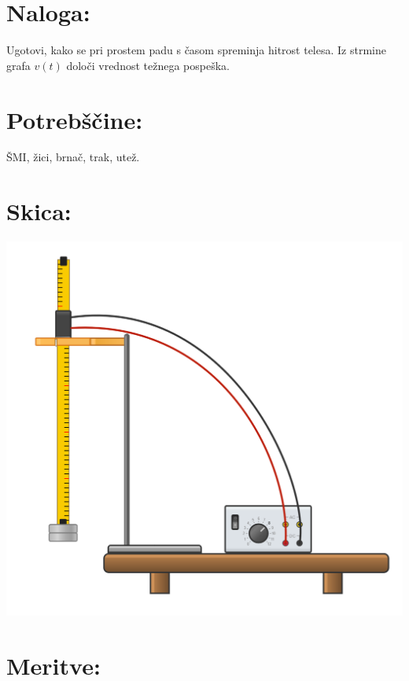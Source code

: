 \documentclass[a4paper]{article}
\begin{document}



\section*{Naloga:} %

Ugotovi, kako se pri prostem padu s časom spreminja hitrost telesa. Iz strmine grafa $v(t)$ določi vrednost težnega pospeška.

\section*{Potrebščine:}

ŠMI, žici, brnač, trak, utež.

\section*{Skica:}
\begin{center}
\includegraphics[scale=0.3]{skica.png}
\end{center}
\section*{Meritve:}
\end{document}
